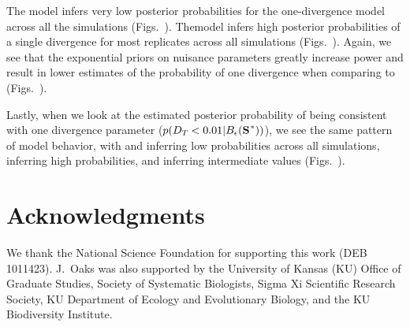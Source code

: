 \documentclass[letterpaper,12pt]{article}
\begin{document}
\begin{linenumbers}
The \modelUniform model infers very low posterior probabilities for the
one-divergence model across all the simulations (Figs.\
).
The\modelOld model infers high posterior probabilities of a single divergence
for most replicates across all simulations (Figs.\
).
Again, we see that the exponential priors on nuisance parameters greatly
increase power and result in lower estimates of the probability of
one divergence when comparing \modelUshaped to \modelOld (Figs.\
).

Lastly, when we look at the estimated posterior probability of
\divTimeDispersion being consistent with one divergence parameter
($p(\divTimeDispersion < 0.01 | \ssSpace)$), we see the same pattern of model
behavior, with \modelDPP and \modelUniform inferring low probabilities across
all simulations, \modelOld inferring high probabilities, and \modelUshaped
inferring intermediate values (Figs.\
).

\section*{Acknowledgments}
We thank the National Science Foundation for supporting this work (DEB
1011423).
J.\ Oaks was also supported by the University of Kansas (KU) Office of Graduate
Studies, Society of Systematic Biologists, Sigma Xi Scientific Research
Society, KU Department of Ecology and Evolutionary Biology, and the KU
Biodiversity Institute.



\newpage
\singlespacing

\renewcommand\listfigurename{Figure Captions}
\renewcommand\cftdotsep{\cftnodots}
\setlength\cftbeforefigskip{10pt}
\cftpagenumbersoff{fig}
\listoffigures


\end{linenumbers}
\end{document}
